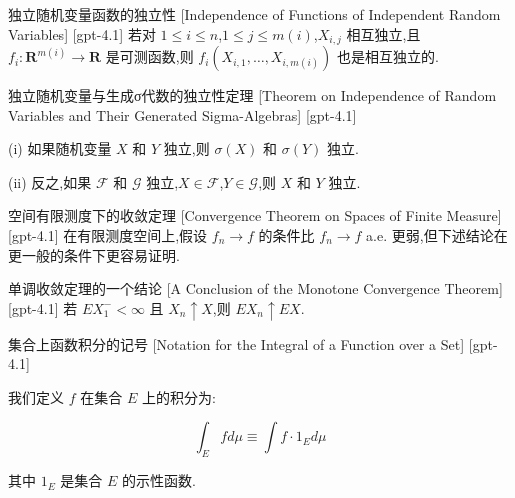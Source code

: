 \documentclass[UTF8]{ctexart}
\begin{document}
    
    
    \begin{thm}
        {独立随机变量函数的独立性}
        [Independence of Functions of Independent Random Variables]
        [gpt-4.1]
        若对 $1 \leq i \leq n$,$1 \leq j \leq m(i)$,$X_{i, j}$ 相互独立,且 $f_{i}: \mathbf{R}^{m(i)} \to \mathbf{R}$ 是可测函数,则 $f_{i}(X_{i, 1}, \ldots, X_{i, m(i)})$ 也是相互独立的.
    \end{thm}
    
    
    
    \begin{thm}
        {独立随机变量与生成σ代数的独立性定理}
        [Theorem on Independence of Random Variables and Their Generated Sigma-Algebras]
        [gpt-4.1]
        
(i) 如果随机变量 $X$ 和 $Y$ 独立,则 $\sigma(X)$ 和 $\sigma(Y)$ 独立.

(ii) 反之,如果 $\mathcal{F}$ 和 $\mathcal{G}$ 独立,$X \in \mathcal{F}$,$Y \in \mathcal{G}$,则 $X$ 和 $Y$ 独立.

    \end{thm}
    
    
    
    \begin{thm}
        {空间有限测度下的收敛定理}
        [Convergence Theorem on Spaces of Finite Measure]
        [gpt-4.1]
        在有限测度空间上,假设 $f_{n} \to f$ 的条件比 $f_{n} \to f$ a.e. 更弱,但下述结论在更一般的条件下更容易证明.
    \end{thm}
    
    
    
    \begin{thm}
        {单调收敛定理的一个结论}
        [A Conclusion of the Monotone Convergence Theorem]
        [gpt-4.1]
        若 $E X_{1}^{-} < \infty$ 且 $X_{n} \uparrow X$,则 $E X_{n} \uparrow E X$.
    \end{thm}
    
    
    
    \begin{dfn}
        {集合上函数积分的记号}
        [Notation for the Integral of a Function over a Set]
        [gpt-4.1]
        
我们定义 $f$ 在集合 $E$ 上的积分为:

\[
\int_{E} f d \mu \equiv \int f \cdot 1_{E} d \mu
\]

其中 $1_{E}$ 是集合 $E$ 的示性函数.

    \end{dfn}
    
\end{document}
